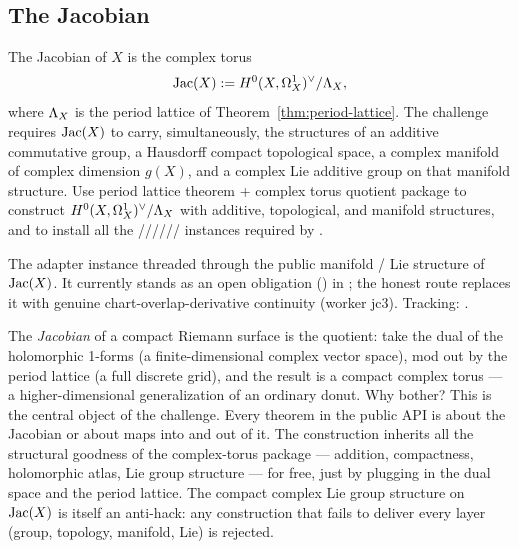 \subsection{The Jacobian}

\begin{definition}
\label{def:analytic-jacobian}
The Jacobian of \(X\) is the complex torus
\[
  \operatorname{Jac}(X) := H^{0}(X,\Omega^{1}_{X})^{\vee} / \Lambda_X ,
\]
where \(\Lambda_X\) is the period lattice of Theorem~\ref{thm:period-lattice}.
The challenge requires \(\operatorname{Jac}(X)\) to carry, simultaneously, the
structures of an additive commutative group, a Hausdorff compact
topological space, a complex manifold of complex dimension \(g(X)\), and
a complex Lie additive group on that manifold structure.
\leanok
\proofplan
Use period lattice theorem + complex torus quotient package to construct
\(H^{0}(X,\Omega^{1}_{X})^{\vee}/\Lambda_X\) with additive, topological, and manifold structures, and
to install all the //////
instances required by .
\end{definition}

\begin{lemma}
\label{lem:stable-chart-at-instance}
The  adapter instance threaded through the public manifold /
Lie structure of \(\operatorname{Jac}(X)\). It currently stands as an open obligation
() in ; the honest route replaces
it with genuine chart-overlap-derivative continuity (worker jc3).
Tracking: .
\end{lemma}

\begin{layman}
The \emph{Jacobian} of a compact Riemann surface is the quotient: take
the dual of the holomorphic 1-forms (a finite-dimensional complex
vector space), mod out by the period lattice (a full discrete grid),
and the result is a compact complex torus --- a higher-dimensional
generalization of an ordinary donut. Why bother? This is the central
object of the challenge. Every theorem in the public API is about the
Jacobian or about maps into and out of it. The construction inherits
all the structural goodness of the complex-torus package --- addition,
compactness, holomorphic atlas, Lie group structure --- for free, just
by plugging in the dual space and the period lattice. The compact
complex Lie group structure on \(\operatorname{Jac}(X)\) is itself an anti-hack: any
construction that fails to deliver every layer (group, topology,
manifold, Lie) is rejected.
\end{layman}

